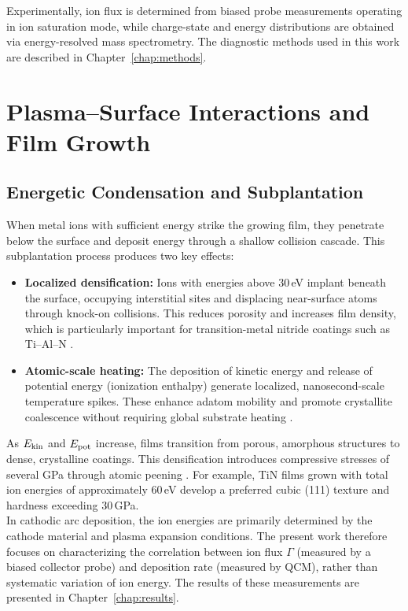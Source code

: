 Experimentally, ion flux is determined from biased probe measurements operating in ion saturation mode, while charge-state and energy distributions are obtained via energy-resolved mass spectrometry. The diagnostic methods used in this work are described in Chapter~\ref{chap:methods}.

\section{Plasma--Surface Interactions and Film Growth}
\subsection{Energetic Condensation and Subplantation}

When metal ions with sufficient energy strike the growing film, they penetrate below the surface and deposit energy through a shallow collision cascade. This subplantation process produces two key effects:

\begin{itemize}
	\item \textbf{Localized densification:} Ions with energies above 30\,eV implant beneath the surface, occupying interstitial sites and displacing near-surface atoms through knock-on collisions. This reduces porosity and increases film density, which is particularly important for transition-metal nitride coatings such as Ti--Al--N \cite[Chap.~8.1]{cathodic_arcs}.
	
	\item \textbf{Atomic-scale heating:} The deposition of kinetic energy and release of potential energy (ionization enthalpy) generate localized, nanosecond-scale temperature spikes. These enhance adatom mobility and promote crystallite coalescence without requiring global substrate heating \cite[Chap.~8.2]{cathodic_arcs}.
\end{itemize}

As $E_{\rm kin}$ and $E_{\rm pot}$ increase, films transition from porous, amorphous structures to dense, crystalline coatings. This densification introduces compressive stresses of several GPa through atomic peening \cite[Chap.~8.1--8.4]{cathodic_arcs}. For example, TiN films grown with total ion energies of approximately 60\,eV develop a preferred cubic (111) texture and hardness exceeding 30\,GPa.\\

In cathodic arc deposition, the ion energies are primarily determined by the cathode material and plasma expansion conditions. The present work therefore focuses on characterizing the correlation between ion flux $\Gamma$ (measured by a biased collector probe) and deposition rate (measured by QCM), rather than systematic variation of ion energy. The results of these measurements are presented in Chapter~\ref{chap:results}.


